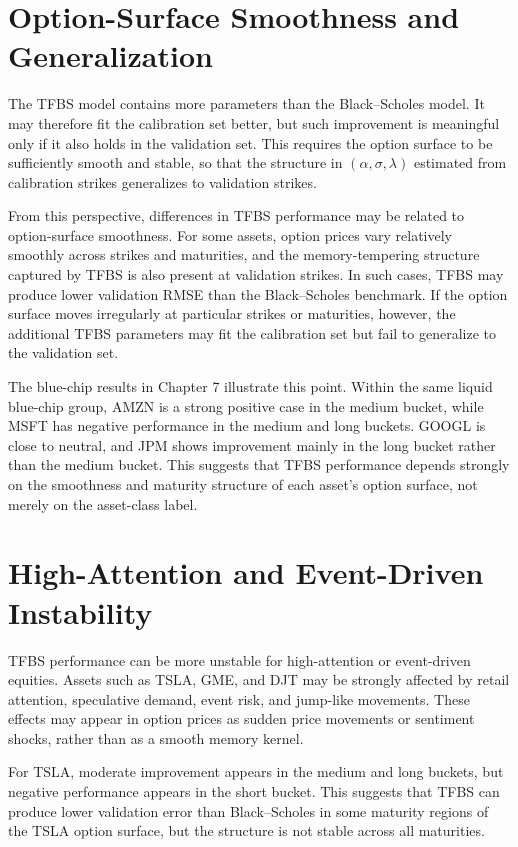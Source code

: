 \documentclass[11pt,a4paper]{report}
\begin{document}
\section{Option-Surface Smoothness and Generalization}

The TFBS model contains more parameters than the Black--Scholes model. It may therefore fit the calibration set better, but such improvement is meaningful only if it also holds in the validation set. This requires the option surface to be sufficiently smooth and stable, so that the structure in $(\alpha,\sigma,\lambda)$ estimated from calibration strikes generalizes to validation strikes.

From this perspective, differences in TFBS performance may be related to option-surface smoothness. For some assets, option prices vary relatively smoothly across strikes and maturities, and the memory-tempering structure captured by TFBS is also present at validation strikes. In such cases, TFBS may produce lower validation RMSE than the Black--Scholes benchmark. If the option surface moves irregularly at particular strikes or maturities, however, the additional TFBS parameters may fit the calibration set but fail to generalize to the validation set.

The blue-chip results in Chapter 7 illustrate this point. Within the same liquid blue-chip group, AMZN is a strong positive case in the medium bucket, while MSFT has negative performance in the medium and long buckets. GOOGL is close to neutral, and JPM shows improvement mainly in the long bucket rather than the medium bucket. This suggests that TFBS performance depends strongly on the smoothness and maturity structure of each asset's option surface, not merely on the asset-class label.

\section{High-Attention and Event-Driven Instability}

TFBS performance can be more unstable for high-attention or event-driven equities. Assets such as TSLA, GME, and DJT may be strongly affected by retail attention, speculative demand, event risk, and jump-like movements. These effects may appear in option prices as sudden price movements or sentiment shocks, rather than as a smooth memory kernel.

For TSLA, moderate improvement appears in the medium and long buckets, but negative performance appears in the short bucket. This suggests that TFBS can produce lower validation error than Black--Scholes in some maturity regions of the TSLA option surface, but the structure is not stable across all maturities.
\end{document}
